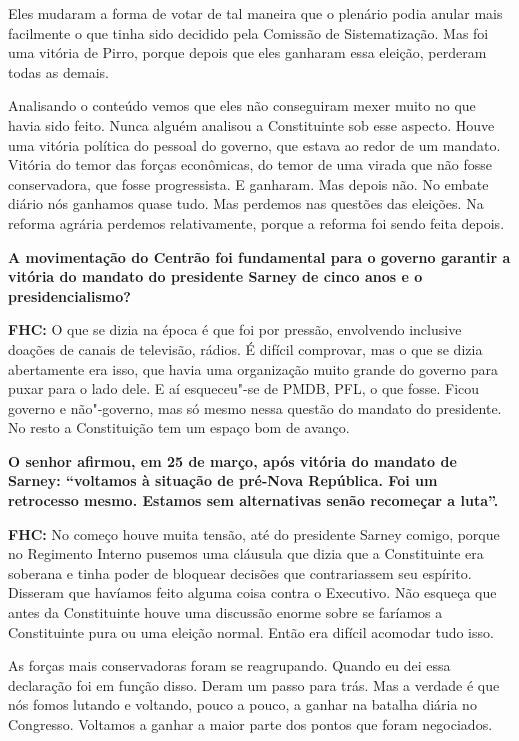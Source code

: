 Eles mudaram a forma de votar de tal maneira que o plenário podia anular
mais facilmente o que tinha sido decidido pela Comissão de
Sistematização. Mas foi uma vitória de Pirro, porque depois que eles
ganharam essa eleição, perderam todas as demais.

Analisando o conteúdo vemos que eles não conseguiram mexer muito no que
havia sido feito. Nunca alguém analisou a Constituinte sob esse aspecto.
Houve uma vitória política do pessoal do governo, que estava ao redor de
um mandato. Vitória do temor das forças econômicas, do temor de uma
virada que não fosse conservadora, que fosse progressista. E ganharam.
Mas depois não. No embate diário nós ganhamos quase tudo. Mas perdemos
nas questões das eleições. Na reforma agrária perdemos relativamente,
porque a reforma foi sendo feita depois.

\textbf{A movimentação do Centrão foi fundamental para o governo
garantir a vitória do mandato do presidente Sarney de cinco anos e o
presidencialismo?}

\textbf{FHC:} O que se dizia na época é que foi por pressão, envolvendo
inclusive doações de canais de televisão, rádios. É difícil comprovar,
mas o que se dizia abertamente era isso, que havia uma organização muito
grande do governo para puxar para o lado dele. E aí esqueceu"-se de PMDB,
PFL, o que fosse. Ficou governo e não"-governo, mas só mesmo nessa
questão do mandato do presidente. No resto a Constituição tem um espaço
bom de avanço.

\textbf{O senhor afirmou, em 25 de março, após vitória do mandato de
Sarney: ``voltamos à situação de pré-Nova República. Foi um retrocesso
mesmo. Estamos sem alternativas senão recomeçar a luta''.}

\textbf{FHC:} No começo houve muita tensão, até do presidente Sarney
comigo, porque no Regimento Interno pusemos uma cláusula que dizia que a
Constituinte era soberana e tinha poder de bloquear decisões que
contrariassem seu espírito. Disseram que havíamos feito alguma coisa
contra o Executivo. Não esqueça que antes da Constituinte houve uma
discussão enorme sobre se faríamos a Constituinte pura ou uma eleição
normal. Então era difícil acomodar tudo isso.

As forças mais conservadoras foram se reagrupando. Quando eu dei essa
declaração foi em função disso. Deram um passo para trás. Mas a verdade
é que nós fomos lutando e voltando, pouco a pouco, a ganhar na batalha
diária no Congresso. Voltamos a ganhar a maior parte dos pontos que
foram negociados.

